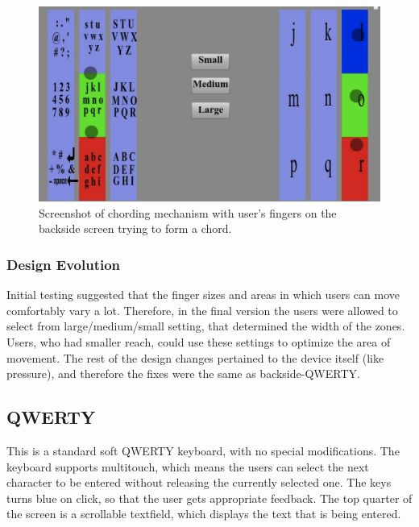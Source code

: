 \begin{figure}
    \includegraphics[scale=0.45]{Figures/chording.pdf} 
    \caption{Screenshot of chording mechanism with user's fingers on
      the backside screen trying to form a chord.}
       \label{fig:chording_example}
\end{figure} 
\subsubsection{Design Evolution}

Initial testing suggested that the finger sizes and areas in which users can move comfortably vary a lot. Therefore, in the final version the users were allowed to select from large/medium/small setting, that determined the width of the zones. Users, who had smaller reach, could use these settings to optimize the area of movement. The rest of the design changes pertained to the device itself (like pressure), and therefore the fixes were the same as backside-QWERTY.

\subsection{QWERTY}

This is a standard soft QWERTY keyboard, with no special modifications. The keyboard supports multitouch, which means the users can select the next character to be entered without releasing the currently selected one. The keys turns blue on click, so that the user gets appropriate feedback. The top quarter of the screen is a scrollable textfield, which displays the text that is being entered.
